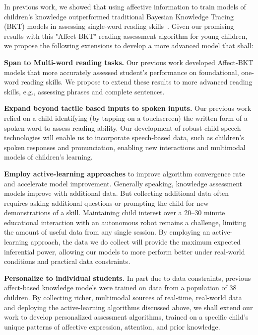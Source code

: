 In previous work, we showed that using affective information to train models of children's knowledge outperformed traditional Bayesian Knowledge Tracing (BKT) models in assessing single-word reading skills~\cite{Spaulding_Gordon_Breazeal_2016}. Given our promising results with this "Affect-BKT" reading assessment algorithm for young children, we propose the following extensions to develop a more advanced model that shall:

{\bf Span to Multi-word reading tasks.} Our previous work developed Affect-BKT models that more accurately assessed student's performance on foundational, one-word reading skills. We propose to extend these results to more advanced reading skills, e.g., assessing phrases and complete sentences.

{\bf Expand beyond tactile based inputs} {\bf to spoken inputs.} Our previous work relied on a child identifying (by tapping on a touchscreen) the written form of a spoken word to assess reading ability. Our development of robust child speech technologies will enable us to incorporate speech-based data, such as children's spoken responses and pronunciation, enabling new  
interactions and multimodal models of children's learning.

{\bf Employ active-learning approaches} to improve algorithm convergence rate and accelerate model improvement. Generally speaking, knowledge assessment models improve with additional data. But collecting additional data often requires asking additional questions or prompting the child for new demonstrations of a skill. Maintaining child interest over a 20--30 minute educational interaction with an autonomous robot remains a challenge, limiting the amount of useful data from any single session. By employing an active-learning approach, the data we do collect will provide the maximum expected inferential power, allowing our models to more perform better under real-world conditions and practical data constraints.

{\bf Personalize to individual students.}  In part due to data constraints, previous affect-based knowledge models were trained on data from a population of 38 children. By collecting richer, multimodal sources of real-time, real-world data and deploying the active-learning algorithms discussed above, we shall extend our work to develop personalized assessment algorithms, trained on a specific child's unique patterns of affective expression, attention, and prior knowledge.


